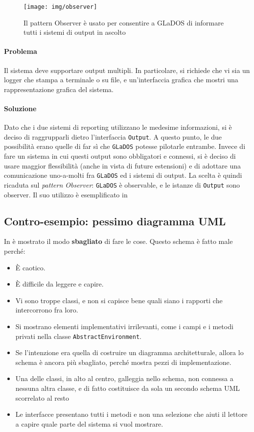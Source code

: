 \documentclass[a4paper,12pt]{report}
\begin{document}
	\begin{figure}[H]
		\centering{}
		\texttt{[image: img/observer]}
		\caption{Il pattern Observer è usato per consentire a GLaDOS di informare tutti i sistemi di output in ascolto}
		\label{img:observer}
	\end{figure}
	
	\paragraph{Problema} Il sistema deve supportare output multipli. In particolare, si richiede che vi sia un logger che stampa a terminale o su file,
	e un'interfaccia grafica che mostri una rappresentazione grafica del sistema.
	
	\paragraph{Soluzione} Dato che i due sistemi di reporting utilizzano le medesime informazioni, si è deciso di raggrupparli dietro l'interfaccia \texttt{Output}.
	A questo punto, le due possibilità erano quelle di far sì che \texttt{GLaDOS} potesse pilotarle entrambe.
	Invece di fare un sistema in cui questi output sono obbligatori e connessi, si è deciso di usare maggior flessibilità (anche in vista di future estensioni)
	e di adottare una comunicazione uno-a-molti fra \texttt{GLaDOS} ed i sistemi di output.
	La scelta è quindi ricaduta sul \textit{pattern Observer}: \texttt{GLaDOS} è observable, e le istanze di \texttt{Output} sono observer.
	Il suo utilizzo è esemplificato in 
	
	
	\subsection*{Contro-esempio: pessimo diagramma UML}
	
	In  è mostrato il modo \textbf{sbagliato} di fare le cose.
	Questo schema è fatto male perché:
	\begin{itemize}
		\item È caotico.
		\item È difficile da leggere e capire.
		\item Vi sono troppe classi, e non si capisce bene quali siano i rapporti che intercorrono fra loro.
		\item Si mostrano elementi implementativi irrilevanti, come i campi e i metodi privati nella classe \texttt{AbstractEnvironment}.
		\item Se l'intenzione era quella di costruire un diagramma architetturale, allora lo schema è ancora più sbagliato, perché mostra pezzi di implementazione.
		\item Una delle classi, in alto al centro, galleggia nello schema, non connessa a nessuna altra classe, e di fatto costituisce da sola un secondo schema UML scorrelato al resto
		\item Le interfacce presentano tutti i metodi e non una selezione che aiuti il lettore a capire quale parte del sistema si vuol mostrare.
	\end{itemize}
	
\end{document}
